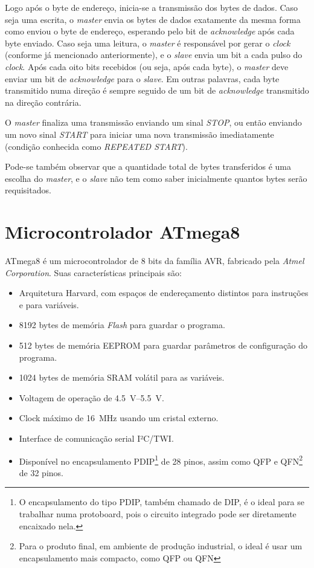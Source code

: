 \documentclass[brazil,pagestart=firstchapter]{abnt}
\begin{document}
Logo após o byte de endereço, inicia-se a transmissão dos bytes de dados.
Caso seja uma escrita, o \textit{master} envia os bytes de dados exatamente
da mesma forma como enviou o byte de endereço, esperando pelo bit de
\textit{acknowledge} após cada byte enviado. Caso seja uma leitura, o
\textit{master} é responsável por gerar o \textit{clock} (conforme já
mencionado anteriormente), e o \textit{slave} envia um bit a cada pulso do
\textit{clock}. Após cada oito bits recebidos (ou seja, após cada byte), o
\textit{master} deve enviar um bit de \textit{acknowledge} para o
\textit{slave}. Em outras palavras, cada byte transmitido numa direção é
sempre seguido de um bit de \textit{acknowledge} transmitido na direção
contrária. \cite[p.~3]{AVR315}

O \textit{master} finaliza uma transmissão enviando um sinal \textit{STOP},
ou então enviando um novo sinal \textit{START} para iniciar uma nova
transmissão imediatamente (condição conhecida como \textit{REPEATED START}).
\cite[p.~158]{ATmega8}

Pode-se também observar que a quantidade total de bytes transferidos é uma
escolha do \textit{master}, e o \textit{slave} não tem como saber
inicialmente quantos bytes serão requisitados.


\section{Microcontrolador ATmega8}
\label{sec:atmega8}

ATmega8 é um microcontrolador de 8 bits da família AVR, fabricado pela
\textit{Atmel Corporation}. Suas características principais são:
\cite{ATmega8}

\begin{itemize}
\item Arquitetura Harvard, com espaços de endereçamento distintos para
instruções e para variáveis.
\item \num{8192} bytes de memória \textit{Flash} para guardar o programa.
\item \num{512} bytes de memória \ac{EEPROM} para guardar parâmetros de
configuração do programa.
\item \num{1024} bytes de memória \ac{SRAM} volátil para as variáveis.
\item Voltagem de operação de \SIrange{4.5}{5.5}{\volt}.
\item Clock máximo de \SI{16}{\mega\hertz} usando um cristal externo.
\item Interface de comunicação serial I²C/TWI.
\item Disponível no encapsulamento PDIP\footnote{
	O encapsulamento do tipo \ac{PDIP}, também chamado de \ac{DIP}, é o
	ideal para se trabalhar numa protoboard, pois o circuito integrado pode
	ser diretamente encaixado nela.}
de 28 pinos, assim como QFP e QFN\footnote{
	Para o produto final, em ambiente de produção industrial, o ideal é usar
	um encapsulamento mais compacto, como \ac{QFP} ou \ac{QFN}}
de 32 pinos.
\end{itemize}
\end{document}
